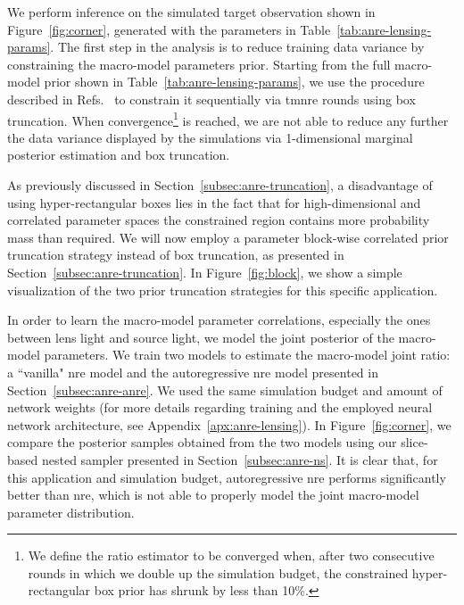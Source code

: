 We perform inference on the simulated target observation shown in Figure~\ref{fig:corner}, generated with the parameters in Table~\ref{tab:anre-lensing-params}. The first step in the analysis is to reduce training data variance by constraining the macro-model parameters prior. Starting from the full macro-model prior shown in Table~\ref{tab:anre-lensing-params}, we use the procedure described in Refs.~\cite{Coogan:2022cky, Montel:2022fhv} to constrain it sequentially via \gls*{tmnre} rounds using box truncation. When convergence\footnote{We define the ratio estimator to be converged when, after two consecutive rounds in which we double up the simulation budget, the constrained hyper-rectangular box prior has shrunk by less than 10\%.} is reached, we are not able to reduce any further the data variance displayed by the simulations via 1-dimensional marginal posterior estimation and box truncation.

As previously discussed in Section~\ref{subsec:anre-truncation}, a disadvantage of using hyper-rectangular boxes lies in the fact that for high-dimensional and correlated parameter spaces the constrained region contains more probability mass than required. We will now employ a parameter block-wise correlated prior truncation strategy instead of box truncation, as presented in Section~\ref{subsec:anre-truncation}. In Figure~\ref{fig:block}, we show a simple visualization of the two prior truncation strategies for this specific application.

In order to learn the macro-model parameter correlations, especially the ones between lens light and source light, we model the joint posterior of the  macro-model parameters. We train two models to estimate the macro-model joint ratio: a ``vanilla" \gls*{nre} model and the autoregressive \gls*{nre} model presented in Section~\ref{subsec:anre-anre}. We used the same simulation budget and amount of network weights (for more details regarding training and the employed neural network architecture, see Appendix~\ref{apx:anre-lensing}). In Figure~\ref{fig:corner}, we compare the posterior samples obtained from the two models using our slice-based nested sampler presented in Section~\ref{subsec:anre-ns}. It is clear that, for this application and simulation budget, autoregressive \gls*{nre} performs significantly better than \gls*{nre}, which is not able to properly model the joint macro-model parameter distribution.

